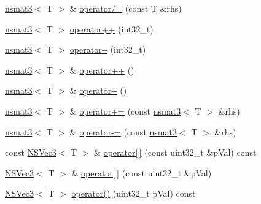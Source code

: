 \begin{DoxyCompactItemize}
\item 
\hyperlink{structnsmat3}{nsmat3}$<$ T $>$ \& \hyperlink{structnsmat3_ae2144f9d5aced1dcb4173f213d42e35f}{operator/=} (const T \&rhs)
\item 
\hyperlink{structnsmat3}{nsmat3}$<$ T $>$ \hyperlink{structnsmat3_a075126f7ed9960327d97c3cd0d839b8c}{operator++} (int32\-\_\-t)
\item 
\hyperlink{structnsmat3}{nsmat3}$<$ T $>$ \hyperlink{structnsmat3_ae81c71d0ca0fdceb32d76f60394ef7ad}{operator-\/-\/} (int32\-\_\-t)
\item 
\hyperlink{structnsmat3}{nsmat3}$<$ T $>$ \& \hyperlink{structnsmat3_aa9119582762213a91f5a6d1b96ef7d2f}{operator++} ()
\item 
\hyperlink{structnsmat3}{nsmat3}$<$ T $>$ \& \hyperlink{structnsmat3_a2a5b577a1bfb9765e2937e3f752d4847}{operator-\/-\/} ()
\item 
\hyperlink{structnsmat3}{nsmat3}$<$ T $>$ \& \hyperlink{structnsmat3_a946603d6c3d4e21d4ae0cbf315870d61}{operator+=} (const \hyperlink{structnsmat3}{nsmat3}$<$ T $>$ \&rhs)
\item 
\hyperlink{structnsmat3}{nsmat3}$<$ T $>$ \& \hyperlink{structnsmat3_a389e6e75c83ee00f0abcf52ce429a82e}{operator-\/=} (const \hyperlink{structnsmat3}{nsmat3}$<$ T $>$ \&rhs)
\item 
const \hyperlink{structNSVec3}{N\-S\-Vec3}$<$ T $>$ \& \hyperlink{structnsmat3_a815d3188524a3efbe8bb161cf0c70910}{operator\mbox{[}$\,$\mbox{]}} (const uint32\-\_\-t \&p\-Val) const 
\item 
\hyperlink{structNSVec3}{N\-S\-Vec3}$<$ T $>$ \& \hyperlink{structnsmat3_afb00e05275bba73d26b0c6fab08b6c58}{operator\mbox{[}$\,$\mbox{]}} (const uint32\-\_\-t \&p\-Val)
\item 
\hyperlink{structNSVec3}{N\-S\-Vec3}$<$ T $>$ \hyperlink{structnsmat3_a70fb0447716d108efb6cf9fc1da7d33b}{operator()} (uint32\-\_\-t p\-Val) const 
\end{DoxyCompactItemize}


